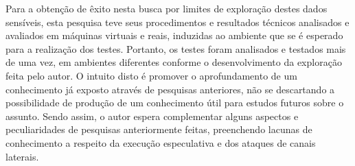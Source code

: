 \documentclass[
	article,			    %
	12pt,				    %
	oneside,			    %
	a4paper,			    %
	chapter=TITLE,		    %
	section=TITLE,		    %
	subsection=TITLE,	    %
	english,			    %
	brazil,				    %
	sumario=tradicional
]{abntex2}
\begin{document}
\begin{comment}
\subsection{Questões de Pesquisa}
\begin{itemize}
    \item Questões abordadas por esta pesquisa:
    \begin{enumerate}
	    \item \label{q1} Quais informações, como fluxo condicional e estrutura de memória, são necessárias para se aplicar execução especulativa em um software?
	    \item \label{q2} Além de usar o tempo de retorno da memória cache para extrair as informações da própria memória cache, quais ataques de hardware também podem ser usados para desviar dados deste canal lateral?
	    \item \label{q3} Quais endereços da memória cache são acessíveis a um programa de nível de usuário, que podem serem utilizados como canal alternativo?
	    \item \label{q4} Quais são os outros canais laterais existentes (além da memória cache), que outros autores já exploraram?
	\end{enumerate}
    \item Questões de pesquisa para trabalhos futuros:
    \begin{enumerate}
	    \item \label{qf1} Como executar instruções mais complexas, além de somente desvios de informação, aproveitando-se da execução especulativa?
	    \item \label{qf1} Segundo \citeonline{Kocher2018spectre} até mesmo códigos que não contenham instruções com ramificações condicionais estão em risco. Como explorá-los?
	\end{enumerate}
\end{itemize}
\end{comment}
Para a obtenção de êxito nesta busca por limites de exploração destes dados sensíveis, esta pesquisa teve seus procedimentos e resultados técnicos analisados e avaliados em máquinas virtuais e reais, induzidas ao ambiente que se é esperado para a realização dos testes. Portanto, os testes foram analisados e testados mais de uma vez, em ambientes diferentes conforme o desenvolvimento da exploração feita pelo autor. O intuito disto é promover o aprofundamento de um conhecimento já exposto através de pesquisas anteriores, não se descartando a possibilidade de produção de um conhecimento útil para estudos futuros sobre o assunto. Sendo assim, o autor espera complementar alguns aspectos e peculiaridades de pesquisas anteriormente feitas, preenchendo lacunas de conhecimento a respeito da execução especulativa e dos ataques de canais laterais.
\end{document}
